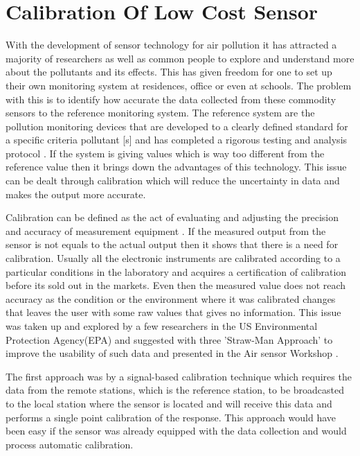\documentclass[12pt,a4paper,oneside]{report}
\begin{document}
\section*{Calibration Of Low Cost Sensor}

With the development of sensor technology for air pollution it has attracted a majority of researchers as well as common people to explore and understand more about the pollutants and its effects. This has given freedom for one to set up their own monitoring system at residences, office or even at schools. The problem with this is to identify how accurate the data collected from these commodity sensors to the reference monitoring system. The reference system are the pollution monitoring devices that are developed to a clearly defined standard for a specific criteria pollutant [s] and has completed a rigorous testing and analysis protocol \cite{Hall2014}. If the system is giving values which is way too different from the reference value then it brings down the advantages of this technology. This issue can be dealt through calibration which will reduce the uncertainty in data and makes the output more accurate. 
\par 
Calibration can be defined as the act of evaluating and adjusting the precision and accuracy of measurement equipment \cite{Kejuruteraan2018}. If the measured output from the sensor is not equals to the actual output then it shows that there is a need for calibration. Usually all the electronic instruments are calibrated according to a particular conditions in the laboratory and acquires a certification of calibration before its sold out in the markets. Even then the measured value does not reach accuracy as the condition or the environment where it was calibrated changes that leaves the user with some raw values that gives no information. This issue was taken up and explored by a few researchers in the US Environmental Protection Agency(EPA) and suggested with three 'Straw-Man Approach' to improve the usability of such data and presented in the Air sensor Workshop \cite{Williams2013}. 

The first approach was by a signal-based calibration technique which requires the data from the remote stations, which is the reference station, to be broadcasted to the local station where the sensor is located and will receive this data and performs a single point calibration of the response. This approach would have been easy if the sensor was already equipped with the data collection and would process automatic calibration. 
\end{document}
